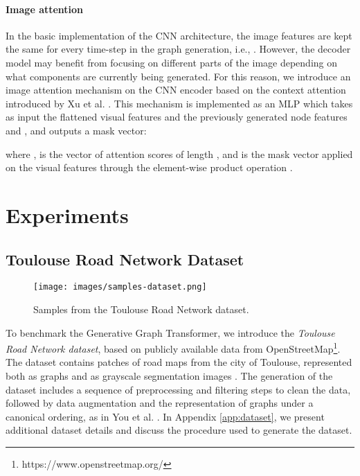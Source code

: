 \documentclass{article}
\begin{document}
\paragraph{Image attention}
In the basic implementation of the CNN architecture, the image features are kept the same for every time-step in the graph generation, i.e., . However, the decoder model may benefit from focusing on different parts of the image depending on what components are currently being generated. For this reason, we introduce an image attention mechanism on the CNN encoder based on the context attention introduced by Xu et al. \citep{xu2015show}. This mechanism is implemented as an MLP which takes as input the flattened visual features  and the previously generated node features  and , and outputs a mask vector:
\vskip -0.15in

\vskip -0.10in
where ,  is the vector of attention scores of length , and  is the mask vector applied on the visual features through the element-wise product operation . 




\section{Experiments}
\vskip -0.05in
\subsection{Toulouse Road Network Dataset}
\label{sec:dataset-preparation}

\begin{wrapfigure}{r}{0.26\textwidth}
\centering
\vskip -0.15in
    \centering
    \texttt{[image: images/samples-dataset.png]}
    \caption{Samples from the Toulouse Road Network dataset.}
    \label{fig:samples}
\vskip -0.15in
\end{wrapfigure}

To benchmark the Generative Graph Transformer, we introduce the \textit{Toulouse Road Network dataset}, based on publicly available data from OpenStreetMap\footnote{https://www.openstreetmap.org/}. The dataset contains patches of road maps from the city of Toulouse, represented both as graphs  and as grayscale segmentation images . 
The generation of the dataset includes a sequence of preprocessing and filtering steps to clean the data, followed by data augmentation and the representation of graphs under a canonical ordering, as in You et al. \citep{you2018graphrnn}. In Appendix \ref{app:dataset}, we present additional dataset details and discuss the procedure used to generate the dataset.
\end{document}
